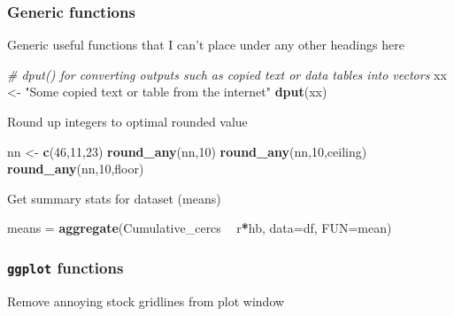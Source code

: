 \documentclass[10,portrait]{article}
\newenvironment{Shaded}{\begin{snugshade}}{\end{snugshade}}
\newcommand{\KeywordTok}[1]{\textcolor[rgb]{0.13,0.29,0.53}{\textbf{#1}}}
\newcommand{\DataTypeTok}[1]{\textcolor[rgb]{0.13,0.29,0.53}{#1}}
\newcommand{\DecValTok}[1]{\textcolor[rgb]{0.00,0.00,0.81}{#1}}
\newcommand{\StringTok}[1]{\textcolor[rgb]{0.31,0.60,0.02}{#1}}
\newcommand{\CommentTok}[1]{\textcolor[rgb]{0.56,0.35,0.01}{\textit{#1}}}
\newcommand{\OperatorTok}[1]{\textcolor[rgb]{0.81,0.36,0.00}{\textbf{#1}}}
\newcommand{\NormalTok}[1]{#1}
\begin{document}
\subsubsection{Generic functions}\label{generic-functions}

Generic useful functions that I can't place under any other headings
here

\begin{Shaded}
\begin{Highlighting}[]
\CommentTok{# dput() for converting outputs such as copied text or data tables into vectors}
\NormalTok{xx <-}\StringTok{ "Some copied text or table from the internet"}
\KeywordTok{dput}\NormalTok{(xx)}
\end{Highlighting}
\end{Shaded}

Round up integers to optimal rounded value

\begin{Shaded}
\begin{Highlighting}[]
\NormalTok{nn <-}\StringTok{ }\KeywordTok{c}\NormalTok{(}\DecValTok{46}\NormalTok{,}\DecValTok{11}\NormalTok{,}\DecValTok{23}\NormalTok{)}
\KeywordTok{round_any}\NormalTok{(nn,}\DecValTok{10}\NormalTok{)}
\KeywordTok{round_any}\NormalTok{(nn,}\DecValTok{10}\NormalTok{,ceiling)}
\KeywordTok{round_any}\NormalTok{(nn,}\DecValTok{10}\NormalTok{,floor)}
\end{Highlighting}
\end{Shaded}

Get summary stats for dataset (means)

\begin{Shaded}
\begin{Highlighting}[]
\NormalTok{means =}\StringTok{ }\KeywordTok{aggregate}\NormalTok{(Cumulative_cercs }\OperatorTok{~}\StringTok{ }\NormalTok{r}\OperatorTok{*}\NormalTok{hb, }\DataTypeTok{data=}\NormalTok{df,  }\DataTypeTok{FUN=}\NormalTok{mean)}
\end{Highlighting}
\end{Shaded}

\subsubsection{\texorpdfstring{\texttt{ggplot}
functions}{ggplot functions}}\label{ggplot-functions}

Remove annoying stock gridlines from plot window
\end{document}
